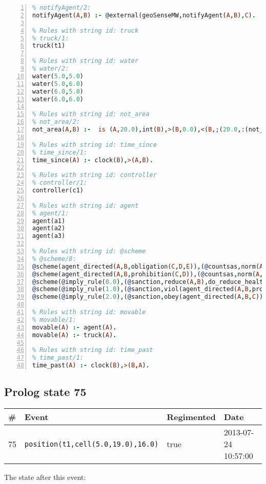 \documentclass[11pt]{article}\usepackage[utf8]{inputenc}\usepackage{geometry}
\begin{document}
\begin{lstlisting}[language=Prolog, numbers=left]
% Rules with string id: notifyAgent
% notifyAgent/2:
notifyAgent(A,B) :- @external(geoSenseMW,notifyAgent(A,B),C).

% Rules with string id: truck
% truck/1:
truck(t1)

% Rules with string id: water
% water/2:
water(5.0,5.0)
water(5.0,6.0)
water(6.0,5.0)
water(6.0,6.0)

% Rules with string id: not_area
% not_area/2:
not_area(A,B) :-  is (A,20.0),int(B),>(B,0.0),<(B,;(20.0,:(not_area(A,B), is (-(B),20.0)))),int(A),>(A,0.0),<(A,;(20.0,:(area(A,B),-(int(A))))),int(B),>(A,0.0),>(B,0.0),<(A,21.0),<(B,21.0).

% Rules with string id: time_since
% time_since/1:
time_since(A) :- clock(B),>(A,B).

% Rules with string id: controller
% controller/1:
controller(c1)

% Rules with string id: agent
% agent/1:
agent(a1)
agent(a2)
agent(a3)

% Rules with string id: @scheme
% @scheme/8:
@scheme(agent_directed(A,B,obligation(C,D,E)),(@countsas,norm(A,B,F,obligation(C,D,E)),F),false,(listTrue(C)),(time_past(D)),false,[plus(viol(agent_directed(A,B,obligation(C,D,E))))|[]],[plus(obey(agent_directed(A,B,obligation(C,D,E))))|[]])
@scheme(agent_directed(A,B,prohibition(C,D)),(@countsas,norm(A,B,E,prohibition(C,D)),E),(listTrue(C)),false,(false),false,[plus(viol(agent_directed(A,B,prohibition(C,D))))|[]],[plus(obey(agent_directed(A,B,prohibition(C,D))))|[]])
@scheme(@imply_rule(0.0),(@sanction,reduce(A,B),do_reduce_health(A,B),notifyAgent(A,changed(status))),true,false,false,false,[min(reduce(A,B))|[]],[])
@scheme(@imply_rule(1.0),(@sanction,viol(agent_directed(A,B,prohibition(C,D))),do_sanction(D)),true,false,false,false,[min(viol(agent_directed(A,B,prohibition(C,D))))|[]],[])
@scheme(@imply_rule(2.0),(@sanction,obey(agent_directed(A,B,C))),true,false,false,false,[min(obey(agent_directed(A,B,C)))|[]],[])

% Rules with string id: movable
% movable/1:
movable(A) :- agent(A).
movable(A) :- truck(A).

% Rules with string id: time_past
% time_past/1:
time_past(A) :- clock(B),>(B,A).

\end{lstlisting}
\clearpage 
\subsection{Prolog state 75}
\begin{table}[ht]
\centering 
\begin{tabular}{l l l l} 
\textbf{\#} & \textbf{Event} & \textbf{Regimented} & \textbf{Date} \\ [0.5ex] 
\hline
75&\texttt{position(t1,cell(5.0,19.0),16.0)}&true&2013-07-24 10:57:00\\ [1ex] \hline\end{tabular}
\end{table}
The state after this event:
\end{document}
